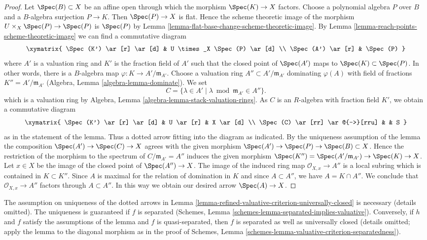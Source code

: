 \begin{proof}
\medskip\noindent
Let $\Spec(B) \subset X$ be an affine open through which
the morphism $\Spec(K) \to X$ factors. Choose a polynomial
algebra $P$ over $B$ and a $B$-algebra surjection $P \to K$.
Then $\Spec(P) \to X$ is flat. Hence the scheme theoretic image
of the morphism $U \times_X \Spec(P) \to \Spec(P)$ is $\Spec(P)$ by
Lemma \ref{lemma-flat-base-change-scheme-theoretic-image}.
By Lemma \ref{lemma-reach-points-scheme-theoretic-image}
we can find a commutative diagram
$$
\xymatrix{
\Spec(K') \ar[r] \ar[d] & U \times_X \Spec(P) \ar[d] \\
\Spec(A') \ar[r] & \Spec(P)
}
$$
where $A'$ is a valuation ring and $K'$ is the fraction field of $A'$
such that the closed point of $\Spec(A')$ maps to $\Spec(K) \subset \Spec(P)$.
In other words, there is a $B$-algebra map
$\varphi : K \to A'/\mathfrak m_{A'}$. Choose a valuation ring
$A'' \subset A'/\mathfrak m_{A'}$ dominating $\varphi(A)$ with
field of fractions $K'' = A'/\mathfrak m_{A'}$
(Algebra, Lemma \ref{algebra-lemma-dominate}). We set
$$
C = \{\lambda \in A' \mid \lambda \bmod \mathfrak m_{A'} \in A''\}.
$$
which is a valuation ring by
Algebra, Lemma \ref{algebra-lemma-stack-valuation-rings}.
As $C$ is an $R$-algebra with fraction field $K'$, we obtain a
commutative diagram
$$
\xymatrix{
\Spec(K') \ar[r] \ar[d] & U \ar[r] & X \ar[d] \\
\Spec(C) \ar[rr] \ar@{-->}[rru] & & S
}
$$
as in the statement of the lemma. Thus a dotted arrow fitting into
the diagram as indicated. By the uniqueness assumption of the lemma
the composition $\Spec(A') \to \Spec(C) \to X$ agrees with the
given morphism $\Spec(A') \to \Spec(P) \to \Spec(B) \subset X$.
Hence the restriction of the morphism to the spectrum of
$C/\mathfrak m_{A'} = A''$ induces the given morphism
$\Spec(K'') = \Spec(A'/\mathfrak m_{A'}) \to \Spec(K) \to X$.
Let $x \in X$ be the image of the closed point of $\Spec(A'') \to X$.
The image of the induced ring map $\mathcal{O}_{X, x} \to A''$
is a local subring which is contained in $K \subset K''$.
Since $A$ is maximal for the relation of domination in $K$
and since $A \subset A''$, we have $A = K \cap A''$. We conclude
that $\mathcal{O}_{X, x} \to A''$ factors through $A \subset A''$.
In this way we obtain our desired arrow $\Spec(A) \to X$.
\end{proof}

\begin{remark}
\label{remark-check-val-on-open}
The assumption on uniqueness of the dotted arrows in
Lemma \ref{lemma-refined-valuative-criterion-universally-closed}
is necessary (details omitted). The uniqueness is guaranteed if
$f$ is separated
(Schemes, Lemma \ref{schemes-lemma-separated-implies-valuative}).
Conversely, if $h$ and $f$ satisfy the assumptions
of the lemma and $f$ is quasi-separated, then $f$ is separated as well as
universally closed (details omitted; apply the lemma to the diagonal morphism
as in the proof of
Schemes, Lemma \ref{schemes-lemma-valuative-criterion-separatedness}).
\end{remark}



